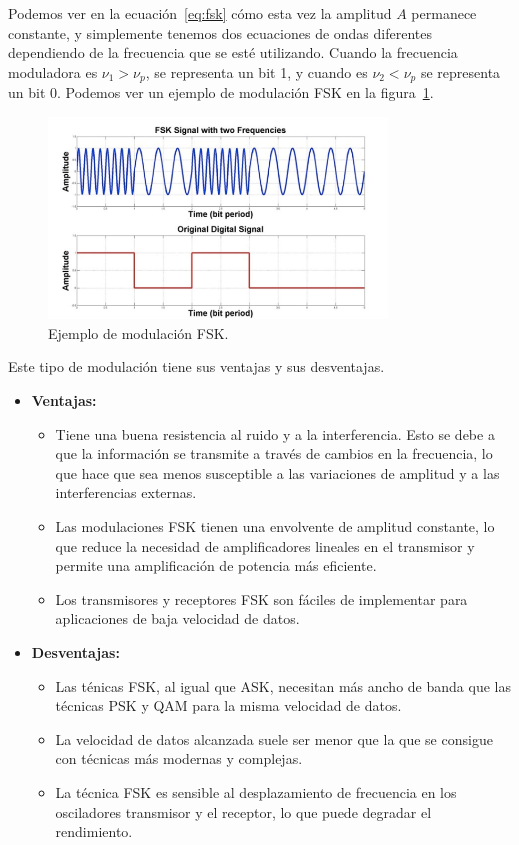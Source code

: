 \documentclass[12pt, letterpaper]{article}
\begin{document}
Podemos ver en la ecuación~\ref{eq:fsk} cómo esta vez la amplitud $A$ permanece constante, y simplemente tenemos dos ecuaciones de ondas diferentes dependiendo de la frecuencia que se esté utilizando. Cuando la frecuencia moduladora es $\nu_1 > \nu_p$, se representa un bit 1, y cuando es $\nu_2 < \nu_p$ se representa un bit 0. Podemos ver un ejemplo de modulación FSK en la figura~\ref{fig:fsk}.
\begin{figure}[h]
    \centering
    \includegraphics[width=9cm]{images/FSK.png}
\caption{Ejemplo de modulación FSK.\label{fig:fsk}}
\end{figure}

Este tipo de modulación tiene sus ventajas y sus desventajas.
\begin{itemize}
    \item \textbf{Ventajas:}
    \begin{itemize}
        \item Tiene una buena resistencia al ruido y a la interferencia. Esto se debe a que la información se transmite a través de cambios en la frecuencia, lo que hace que sea menos susceptible a las variaciones de amplitud y a las interferencias externas.
        \item Las modulaciones FSK tienen una envolvente de amplitud constante, lo que reduce la necesidad de amplificadores lineales en el transmisor y permite una amplificación de potencia más eficiente.
        \item Los transmisores y receptores FSK son fáciles de implementar para aplicaciones de baja velocidad de datos.
    \end{itemize}

    \item \textbf{Desventajas:}
    \begin{itemize}
        \item Las ténicas FSK, al igual que ASK, necesitan más ancho de banda que las técnicas PSK y QAM para la misma velocidad de datos. 
        \item La velocidad de datos alcanzada suele ser menor que la que se consigue con técnicas más modernas y complejas.
        \item La técnica FSK es sensible al desplazamiento de frecuencia en los osciladores transmisor y el receptor, lo que puede degradar el rendimiento.
    \end{itemize}
\end{itemize}
\end{document}
